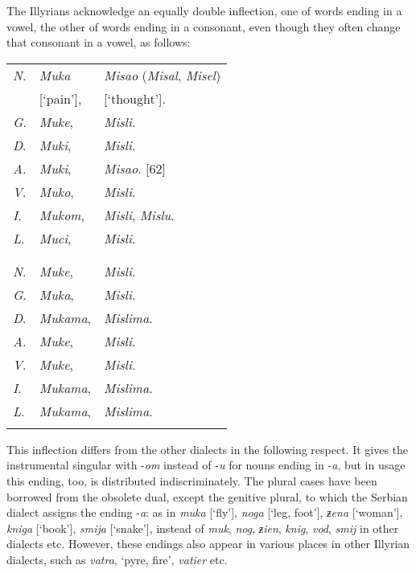 The Illyrians acknowledge an equally double inflection, one of words ending in a vowel, the other of words ending in a consonant, even though they often change that consonant in a vowel, as follows:

\newpage

\begin{longtable}{ l l l }
    \lsptoprule
    \multicolumn{3}{ c }{Singular.} \\
    \midrule
    \textit{N}. & \textit{Muka} & \textit{Misao} (\textit{Misal}, \textit{Misel}) \\
    & [‘pain’], & [‘thought’]. \\
    \textit{G}. & \textit{Muke}, & \textit{Misli}. \\
    \textit{D}. & \textit{Muki}, & \textit{Misli}. \\ 
    \textit{A}. & \textit{Muki}, & \textit{Misao}. [62] \\
    \textit{V}. & \textit{Muko}, & \textit{Misli}. \\
    \textit{I}. & \textit{Mukom}, & \textit{Misli}, \textit{Mislu}.  \\
    \textit{L}. & \textit{Muci}, & \textit{Misli}. \\
    \lspbottomrule
    \\
    \lsptoprule
    \multicolumn{3}{ c }{Plural.} \\
    \midrule
    \textit{N}. & \textit{Muke}, & \textit{Misli}. \\
    \textit{G}. & \textit{Muka}, & \textit{Misli}. \\
    \textit{D}. & \textit{Mukama}, & \textit{Mislima}. \\ 
    \textit{A}. & \textit{Muke}, & \textit{Misli}. \\
    \textit{V}. & \textit{Muke}, & \textit{Misli}. \\
    \textit{I}. & \textit{Mukama}, & \textit{Mislima}. \\
    \textit{L}. & \textit{Mukama}, & \textit{Mislima}. \\
    \lspbottomrule
\end{longtable}

This inflection differs from the other dialects in the following respect. It gives the instrumental singular with -\textit{om} instead of -\textit{u} for nouns ending in -\textit{a}, but in usage this ending, too, is distributed indiscriminately. The plural cases have been borrowed from the obsolete dual, except the genitive plural, to which the Serbian dialect assigns the ending -\textit{a}: as in \textit{muka} [‘fly’], \textit{noga} [‘leg, foot’], \textit{ƶena} [‘woman’], \textit{kniga} [‘book’], \textit{smija} [‘snake’], instead of \textit{muk}, \textit{nog}, \textit{ƶien}, \textit{knig}, \textit{vod}, \textit{smij} in other dialects etc. However, these endings also appear in various places in other Illyrian dialects, such as \textit{vatra}, ‘pyre, fire’, \textit{vatier} etc.

